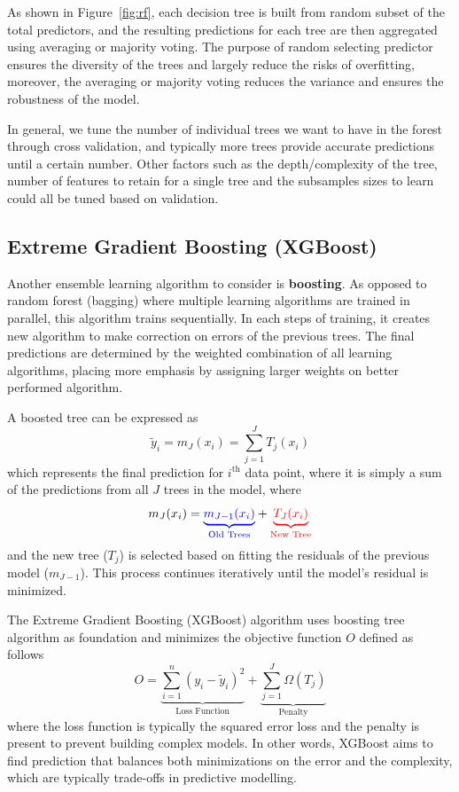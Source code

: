 \documentclass[oneside, 12pt]{article}
\newcommand*{\1}{\text{\scalebox{1.1}{\usefont{U}{bbold}{m}{n}1}}}
\begin{document}
As shown in Figure~\ref{fig:rf}, each decision tree is built from random subset of the total predictors, and the resulting predictions for each tree are then aggregated using averaging or majority voting. The purpose of random selecting predictor ensures the diversity of the trees and largely reduce the risks of overfitting, moreover, the averaging or majority voting reduces the variance and ensures the robustness of the model.  \newline

In general, we tune the number of individual trees we want to have in the forest through cross validation, and typically more trees provide accurate predictions until a certain number. Other factors such as the depth/complexity of the tree, number of features to retain for a single tree and the subsamples sizes to learn could all be tuned based on validation. 

\subsection{Extreme Gradient Boosting (XGBoost)}
Another ensemble learning algorithm to consider is \textbf{boosting}. As opposed to random forest (bagging) where multiple learning algorithms are trained in parallel, this algorithm trains sequentially. In each steps of training, it creates new algorithm to make correction on errors of the previous trees. The final predictions are determined by the weighted combination of all learning algorithms, placing more emphasis by assigning larger weights on better performed algorithm. \newline

A boosted tree can be expressed as 
$$
\tilde{y}_i = m_J(x_i) = \sum_{j = 1}^J T_j(x_i)
$$
which represents the final prediction for $i^{\text{th}}$ data point, where it is simply a sum of the predictions from all $J$ trees in the model, where
$$
m_J(x_i) = \textcolor{blue}{\underbrace{m_{J - 1}(x_i)}_{\text{Old Trees}}} + \textcolor{red}{\underbrace{T_J(x_i)}_{\text{New Tree}}}
$$
and the new tree ($T_j$) is selected based on fitting the residuals of the previous model ($m_{J - 1}$). This process continues iteratively until the model's residual is minimized. \newline

The Extreme Gradient Boosting (XGBoost) algorithm uses boosting tree algorithm as foundation and minimizes the objective function $O$ defined as follows
$$
O = \underbrace{\sum_{i = 1}^n (y_i - \tilde{y}_i)^2}_{\text{Loss Function}} + \underbrace{\sum_{j = 1}^J \Omega(T_j)}_{\text{Penalty}}
$$
where the loss function is typically the squared error loss and the penalty is present to prevent building complex models. In other words, XGBoost aims to find prediction that balances both minimizations on the error and the complexity, which are typically trade-offs in predictive modelling. \newline
\end{document}
